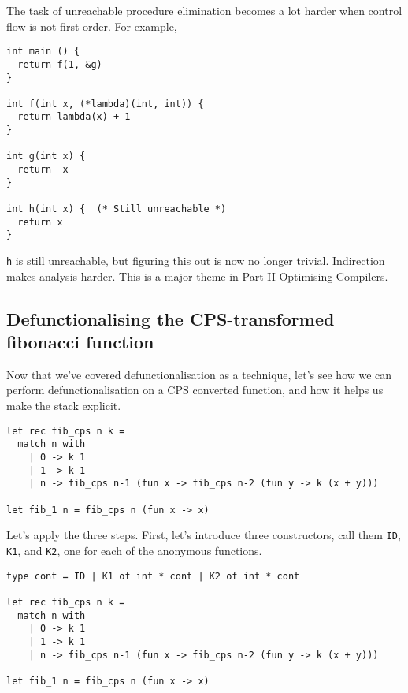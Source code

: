 The task of unreachable procedure elimination becomes a lot harder when control flow is not first order. For example,

\begin{code}
\label{code:unreachable-indirection-c}
\begin{verbatim}
int main () {
  return f(1, &g)
}

int f(int x, (*lambda)(int, int)) {
  return lambda(x) + 1
}

int g(int x) {
  return -x
}

int h(int x) {  (* Still unreachable *)
  return x
}
\end{verbatim}
\end{code}

\texttt{h} is still unreachable, but figuring this out is now no longer trivial. Indirection makes analysis harder. This is a major theme in {\sffamily Part II Optimising Compilers}.

\subsection{Defunctionalising the CPS-transformed fibonacci function}
Now that we've covered defunctionalisation as a technique, let's see how we can perform defunctionalisation on a CPS converted function, and how it helps us make the stack explicit.

\begin{code}
\label{code:defun-fib-0}
\begin{verbatim}
let rec fib_cps n k = 
  match n with
    | 0 -> k 1
    | 1 -> k 1
    | n -> fib_cps n-1 (fun x -> fib_cps n-2 (fun y -> k (x + y)))

let fib_1 n = fib_cps n (fun x -> x)
\end{verbatim}
\end{code}

Let's apply the three steps. First, let's introduce three constructors, call them \texttt{ID}, \texttt{K1}, and \texttt{K2}, one for each of the anonymous functions. 

\begin{code}
\label{code:defun-fib-1}
\begin{verbatim}
type cont = ID | K1 of int * cont | K2 of int * cont

let rec fib_cps n k = 
  match n with
    | 0 -> k 1
    | 1 -> k 1
    | n -> fib_cps n-1 (fun x -> fib_cps n-2 (fun y -> k (x + y)))

let fib_1 n = fib_cps n (fun x -> x)
\end{verbatim}
\end{code}

